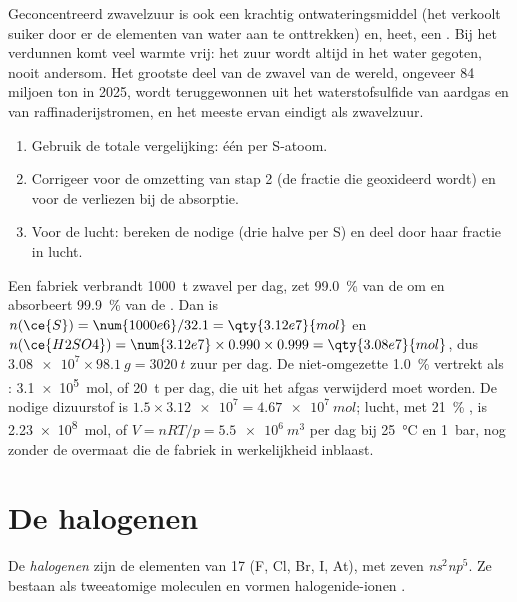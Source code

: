 Geconcentreerd zwavelzuur is ook een krachtig ontwateringsmiddel (het
verkoolt suiker door er de elementen van water aan te onttrekken) en,
heet, een . Bij het verdunnen komt veel warmte vrij: het zuur
wordt altijd in het water gegoten, nooit andersom. Het grootste deel van
de zwavel van de wereld, ongeveer 84 miljoen ton in 2025, wordt
teruggewonnen uit het waterstofsulfide van aardgas en van
raffinaderijstromen, en het meeste ervan eindigt als zwavelzuur.

\begin{method}\label{met:b1:p-block-16-18:contact-balance}
\begin{enumerate}
  \item Gebruik de totale vergelijking: één  per S-atoom.
  \item Corrigeer voor de omzetting van stap 2 (de fractie  die
        geoxideerd wordt) en voor de verliezen bij de absorptie.
  \item Voor de lucht: bereken de nodige  (drie halve per S) en
        deel door haar fractie in lucht.
\end{enumerate}
\end{method}

\begin{example}
Een fabriek verbrandt \qty{1000}{t} zwavel per dag, zet
\qty{99.0}{\percent} van de  om en absorbeert
\qty{99.9}{\percent} van de . Dan is
$n(\ce{S}) = \num{1000e6}/32.1 = \qty{3.12e7}{mol}$ en
$n(\ce{H2SO4}) = \num{3.12e7} \times 0.990 \times 0.999
= \qty{3.08e7}{mol}$, dus $\num{3.08e7} \times \qty{98.1}{g}
= \qty{3020}{t}$ zuur per dag. De niet-omgezette \qty{1.0}{\percent}
vertrekt als : \qty{3.1e5}{mol}, of \qty{20}{t} per dag, die uit
het afgas verwijderd moet worden. De nodige dizuurstof is $1.5 \times \num{3.12e7} =
\qty{4.67e7}{mol}$; lucht, met \qty{21}{\percent} , is
\qty{2.23e8}{mol}, of $V = nRT/p = \qty{5.5e6}{m^3}$ per dag bij
\qty{25}{\celsius} en \qty{1}{bar}, nog zonder de overmaat die de fabriek
in werkelijkheid inblaast.
\end{example}

\section{De halogenen}

\begin{definition}[Halogenen]\label{def:b1:p-block-16-18:halogen}
De \emph{halogenen} zijn de elementen van  17 (F,
Cl, Br, I, At), met zeven  \textit{ns}$^2$\textit{np}$^5$.
Ze bestaan als tweeatomige moleculen  en vormen halogenide-ionen
.
\end{definition}

